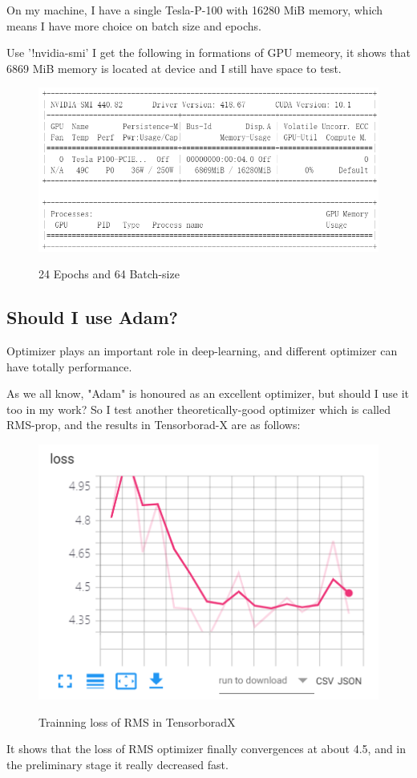 \documentclass{article}
\begin{document}
On my machine, I have a  single Tesla-P-100 with 16280 MiB memory, which means I have more choice on batch size and epochs. 

Use '!nvidia-smi' I get the following in formations of GPU memeory, it shows that 6869 MiB memory is located at device and I still have space to test. 
\begin{figure}[H]%
  \centering
  \caption{24 Epochs and 64 Batch-size}
  \includegraphics[width=\columnwidth]{IMG/ML实验GPU.png} %
  \label{Fig.RNN} %
\end{figure}
\subsection{Should I use Adam?}
Optimizer plays an important role in deep-learning, and different optimizer can have totally performance.

As we all know, "Adam" is honoured as an excellent optimizer, but should I use it too in my work? So I test another theoretically-good optimizer which is called RMS-prop, and the results in Tensorborad-X are as follows:
\begin{figure}[H]%
  \centering
  \caption{Trainning loss of RMS in TensorboradX}
  \includegraphics[width=40ex]{IMG/loss_RMSprop.png} %
  \label{Fig.RNN} %
\end{figure}
It shows that the loss of RMS optimizer finally  convergences at about 4.5, and in the preliminary stage it really decreased fast.
\end{document}
